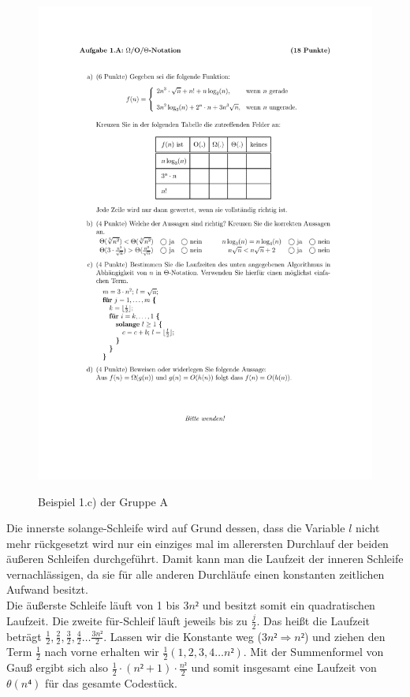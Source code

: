 \documentclass[a4paper, 12pt]{article}
\begin{document}
\begin{figure}[H]
	\caption{Beispiel 1.c) der Gruppe A}
	\vskip 0.2cm
	\centering
	\includegraphics{Figures/Test_2007-11-16_1Ac}
	\label{figure:Test_2007-11-16_1Ac}
\end{figure}

Die innerste solange-Schleife wird auf Grund dessen, dass die Variable $l$ nicht mehr rückgesetzt wird nur ein einziges mal im allerersten Durchlauf der beiden äußeren Schleifen durchgeführt. Damit kann man die Laufzeit der inneren Schleife vernachlässigen, da sie für alle anderen Durchläufe einen konstanten zeitlichen Aufwand besitzt.\\

Die äußerste Schleife läuft von 1 bis $3n²$ und besitzt somit ein quadratischen Laufzeit. Die zweite für-Schleif läuft jeweils bis zu $\frac{j}{2}$. Das heißt die Laufzeit beträgt $\frac{1}{2},\frac{2}{2},\frac{3}{2},\frac{4}{2}\dots\frac{3n²}{2}$. Lassen wir die Konstante weg ($3n² \Rightarrow n²$) und ziehen den Term $\frac{1}{2}$ nach vorne erhalten wir $\frac{1}{2}\left(1,2,3,4\dots n²\right)$. Mit der Summenformel von Gauß ergibt sich also $\frac{1}{2}⋅(n²+1)⋅\frac{n²}{2}$ und somit insgesamt eine Laufzeit von $θ\left(n⁴\right)$ für das gesamte Codestück.
\end{document}
